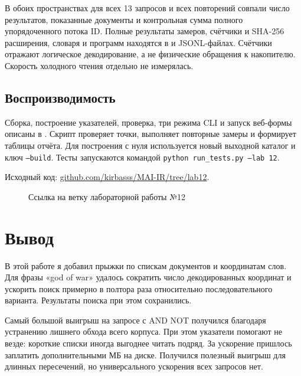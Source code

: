 \documentclass[12pt,a4paper]{article}
\begin{document}
В обоих пространствах для всех 13 запросов и всех повторений совпали
число результатов, показанные документы и контрольная сумма полного
упорядоченного потока ID. Полные результаты замеров, счётчики и SHA-256
расширения, словаря и программ находятся в  и JSONL-файлах.
Счётчики отражают логическое декодирование, а не физические обращения
к накопителю. Скорость холодного чтения отдельно не измерялась.

\subsection{Воспроизводимость}
Сборка, построение указателей, проверка, три режима CLI и запуск веб-формы
описаны в . Скрипт  проверяет точки,
выполняет повторные замеры и формирует таблицы отчёта.
Для построения с нуля используется новый выходной каталог и ключ
\texttt{--build}. Тесты запускаются командой
\texttt{python run\_tests.py --lab 12}.

Исходный код:
\href{https://github.com/kirbasss/MAI-IR/tree/lab12}{github.com/kirbasss/MAI-IR/tree/lab12}.
\begin{figure}[H]
\centering
\begingroup
\hypersetup{urlcolor=black}
\endgroup
\caption{Ссылка на ветку лабораторной работы №12}
\end{figure}

\newpage
\section{Вывод}
В этой работе я добавил прыжки по спискам документов и координатам слов.
Для фразы «god of war» удалось сократить число декодированных координат
и ускорить поиск примерно в полтора раза относительно последовательного
варианта. Результаты поиска при этом сохранились.

Самый большой выигрыш на запросе с AND NOT получился благодаря устранению
лишнего обхода всего корпуса. При этом указатели помогают не везде:
короткие списки иногда выгоднее читать подряд. За ускорение пришлось
заплатить дополнительными \LabTwelveSkipMB{} МБ на диске.
Получился полезный выигрыш для длинных пересечений, но универсального
ускорения всех запросов нет.
\end{document}
